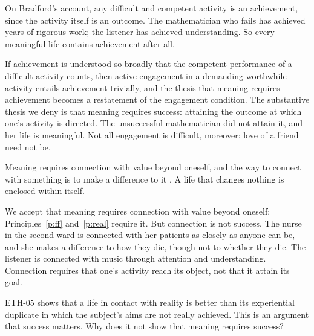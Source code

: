 \documentclass{situationist-preprint}
\begin{document}
\begin{objection}\label{o:broad}
On Bradford's account, any difficult and competent activity is an achievement, since the activity itself is an outcome. The mathematician who fails has achieved years of rigorous work; the listener has achieved understanding. So every meaningful life contains achievement after all.
\end{objection}

\begin{reply}
If achievement is understood so broadly that the competent performance of a difficult activity counts, then active engagement in a demanding worthwhile activity entails achievement trivially, and the thesis that meaning requires achievement becomes a restatement of the engagement condition. The substantive thesis we deny is that meaning requires success: attaining the outcome at which one's activity is directed. The unsuccessful mathematician did not attain it, and her life is meaningful. Not all engagement is difficult, moreover: love of a friend need not be.
\end{reply}

\begin{objection}\label{o:nozick}
Meaning requires connection with value beyond oneself, and the way to connect with something is to make a difference to it \citep{Nozick1981}. A life that changes nothing is enclosed within itself.
\end{objection}

\begin{reply}
We accept that meaning requires connection with value beyond oneself; Principles~\ref{p:ff} and~\ref{p:real} require it. But connection is not success. The nurse in the second ward is connected with her patients as closely as anyone can be, and she makes a difference to how they die, though not to whether they die. The listener is connected with music through attention and understanding. Connection requires that one's activity reach its object, not that it attain its goal.
\end{reply}

\begin{objection}\label{o:machine}
ETH-05 shows that a life in contact with reality is better than its experiential duplicate in which the subject's aims are not really achieved. This is an argument that success matters. Why does it not show that meaning requires success?
\end{objection}
\end{document}
